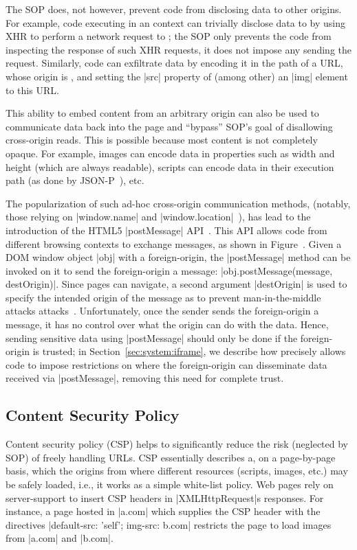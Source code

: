The SOP does, not however, prevent code from disclosing data to other
origins.
%
For example, code executing in an  context can trivially
disclose data to  by using XHR to perform a network
request to ; the SOP only prevents the code from
inspecting the response of such XHR requests, it does not impose any
sending the request.
%
Similarly, code can exfiltrate data by encoding it in the path of a
URL, whose origin is , and setting the \js|src| property
of (among other) an \js|img| element to this URL.

This ability to embed content from an arbitrary origin can also be
used to communicate data back into the page and ``bypass'' SOP's goal
of disallowing cross-origin reads.
%
This is possible because most content is not completely opaque. 
%
For example, images can encode data in properties such as width and
height (which are always readable), scripts can encode data in their
execution path (as done by JSON-P~), etc.
%

The popularization of such ad-hoc cross-origin communication methods,
(notably, those relying on \js|window.name| and
\js|window.location|~), has lead to the
introduction of the HTML5 \js|postMessage| API~.
%
This API allows code from different browsing contexts to exchange
messages, as shown in Figure~.
%
Given a DOM window object \js|obj| with a foreign-origin, the
\js|postMessage| method can be invoked on it to send the
foreign-origin a message: \js|obj.postMessage(message, destOrigin)|.
%
Since pages can navigate, a second argument \js|destOrigin| is used to
specify the intended origin of the message as to prevent
man-in-the-middle attacks attacks~.
%
Unfortunately, once the sender sends the foreign-origin a message, it
has no control over what the origin can do with the data.
%
Hence, sending sensitive data using \js|postMessage| should only be
done if the foreign-origin is trusted;
%
in Section~\ref{sec:system:iframe}, we describe how \sys{} precisely
allows code to impose restrictions on where the foreign-origin can
disseminate data received via \js|postMessage|, removing this need for
complete trust.

\subsection{Content Security Policy} 
\label{sec:background:csp}

Content security policy  (CSP) \tocite{} helps to significantly reduce
the risk (neglected by SOP) of freely handling URLs. CSP essentially describes
a, on a page-by-page basis, which the origins from where different resources
(scripts, images, etc.) may be safely loaded, i.e., it works as a simple
white-list policy.  Web pages rely on server-support to insert CSP headers in
\js|XMLHttpRequest|s responses. For instance, a page hosted in \js|a.com| 
which supplies the CSP header with the directives 
%
\js|default-src: ’self’; img-src: b.com| 
%
restricts the page to load images from \js|a.com| and \js|b.com|.



